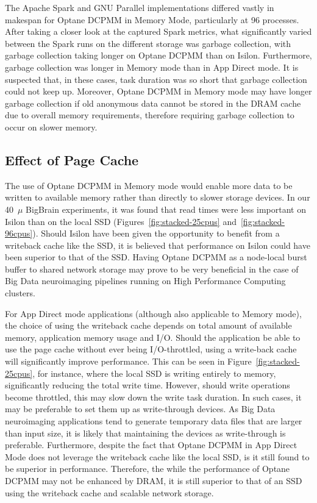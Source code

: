\documentclass[conference]{IEEEtran}
\newcommand{\bigbrain}{BigBrain\xspace}
\begin{document}
The Apache Spark and GNU Parallel implementations differed vastly in makespan 
for Optane DCPMM in Memory Mode, particularly at 96 processes. After taking a closer look at
the captured Spark metrics, what significantly varied between the Spark runs on
the different storage was garbage collection, with garbage collection taking longer on Optane DCPMM 
than on Isilon. Furthermore, garbage collection was longer in Memory mode than in
App Direct mode. It is suspected that, in these cases, task duration was so short
that garbage collection could not keep up. Moreover, Optane DCPMM in Memory mode may have longer
garbage collection if old anonymous data cannot be stored in the DRAM cache due to overall memory 
requirements, therefore requiring garbage collection to occur on slower memory.

\subsection{Effect of Page Cache}

The use of Optane DCPMM in Memory mode would enable more data to be written to available memory
rather than directly to slower storage devices. In our 40~$\mu$ \bigbrain experiments, it was found
that read times were less important on Isilon than on the local SSD (Figures~\ref{fig:stacked-25cpus}
and~\ref{fig:stacked-96cpus}). Should Isilon have been given the opportunity to benefit from a 
writeback cache like the SSD, it is believed that performance on Isilon could have been superior 
to that of the SSD. Having Optane DCPMM as a node-local burst buffer to shared network storage 
may prove to be very beneficial in the case of Big Data neuroimaging pipelines running on
High Performance Computing clusters.

For App Direct mode applications (although also applicable to Memory mode), the 
choice of using the writeback cache depends on total amount of available memory, application
memory usage and I/O. Should the application be able to use the page cache without ever being
I/O-throttled, using a write-back cache will significantly improve performance. This can 
be seen in Figure~\ref{fig:stacked-25cpus}, for instance, where the local SSD is writing
entirely to memory, significantly reducing the total write time. However, should write operations
become throttled, this may slow down the write task duration. In such cases,
it may be preferable to set them up as write-through devices. As Big Data neuroimaging applications
tend to generate temporary data files that are larger than input size, it is likely that maintaining the
devices as write-through is preferable. Furthermore, despite the fact that Optane DCPMM in App Direct Mode does
not leverage the writeback cache like the local SSD, is it still found to be superior in performance.
Therefore, the while the performance of Optane DCPMM may not be enhanced by DRAM, it is still superior to that of
an SSD using the writeback cache and scalable network storage.
\end{document}
